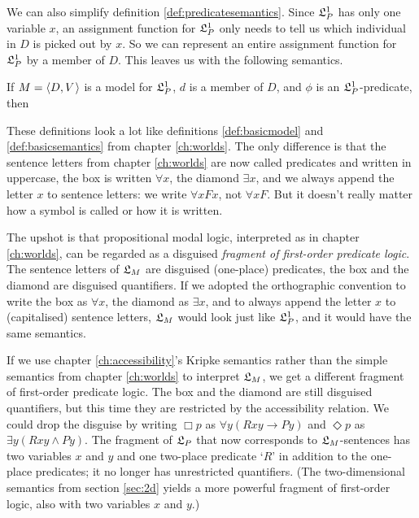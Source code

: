 We can also simplify definition \ref{def:predicatesemantics}. Since $\mathfrak{L}_P^1$ has
only one variable $x$, an assignment function for $\mathfrak{L}_P^1$ only needs to tell us
which individual in $D$ is picked out by $x$. So we can represent an entire
assignment function for $\mathfrak{L}_P^1$ by a member of $D$. This leaves us with the
following semantics.

\begin{justabox}
  If $M = \t{D,V}$ is a model for $\mathfrak{L}_P^1$, $d$ is a member of $D$, and $\phi$
  is an $\mathfrak{L}_{P}^{1}$-predicate, then
  
  \medskip
  \begin{semantics}
  \end{semantics}
\end{justabox}

These definitions look a lot like definitions \ref{def:basicmodel} and
\ref{def:basicsemantics} from chapter \ref{ch:worlds}. The only difference is
that the sentence letters from chapter \ref{ch:worlds} are now called predicates
and written in uppercase, the box is written $\forall x$, the diamond
$\exists x$, and we always append the letter $x$ to sentence letters: we write
$\forall x Fx$, not $\forall x F$. But it doesn't really matter how a symbol is
called or how it is written.

The upshot is that propositional modal logic, interpreted as in chapter
\ref{ch:worlds}, can be regarded as a disguised \emph{fragment of first-order
  predicate logic}. The sentence letters of $\mathfrak{L}_M$ are disguised (one-place)
predicates, the box and the diamond are disguised quantifiers. If we adopted the
orthographic convention to write the box as $\forall x$, the diamond as
$\exists x$, and to always append the letter $x$ to (capitalised) sentence
letters, $\mathfrak{L}_M$ would look just like $\mathfrak{L}_P^1$, and it would have the same
semantics.

If we use chapter \ref{ch:accessibility}'s Kripke semantics rather than the
simple semantics from chapter \ref{ch:worlds} to interpret $\mathfrak{L}_{M}$, we get a
different fragment of first-order predicate logic. The box and the diamond are
still disguised quantifiers, but this time they are restricted by the
accessibility relation. We could drop the disguise by writing $\Box p$ as
$\forall y(Rxy \to Py)$ and $\Diamond p$ as $\exists y(Rxy \land Py)$. The
fragment of $\mathfrak{L}_P$ that now corresponds to $\mathfrak{L}_M$-sentences has two variables
$x$ and $y$ and one two-place predicate `$R$' in addition to the one-place
predicates; it no longer has unrestricted quantifiers. (The two-dimensional
semantics from section \ref{sec:2d} yields a more powerful fragment of first-order
logic, also with two variables $x$ and $y$.)

